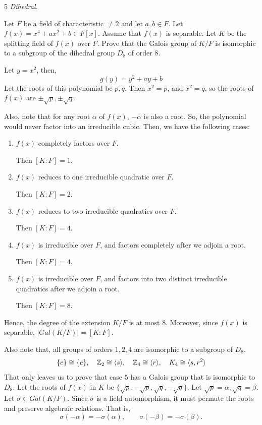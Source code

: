 \documentclass[12pt]{article}
\begin{document}
\newpage 

\begin{problem}{5}
\textit{Dihedral.} 

    Let $F$ be a field of characteristic $\neq 2$ and let $a,b\in F$.
    Let $f(x)=x^4+ax^2+b\in F[x]$. Assume that $f(x)$ is separable.
    Let $K$ be the splitting field of $f(x)$ over $F$.
    Prove that the Galois group of $K/F$ is isomorphic to a subgroup of the dihedral group $D_8$ of order $8$.
\end{problem}

\begin{solution}
    \bbni
    
    Let $y =x^2$, then, 
    \[g(y) = y^2 + ay + b\]
    Let the roots of this polynomial be $p, q$. Then $x^2 = p$, and $x^2 = q$, so the roots of $f(x)$ are $\pm\sqrt{p}, \pm \sqrt{q}$. 
    
    Also, note that for any root $\alpha$ of $f(x)$, $-\alpha$ is also a root. So, the polynomial would never factor into an irreducible cubic. Then, we have the following cases: 
    \begin{enumerate}
        \item $f(x)$ completely factors over $F$.
        
        Then $[K:F] = 1$. 

        \item $f(x)$ reduces to one irreducible quadratic over $F$. 

        Then $[K:F] = 2$. 

        \item $f(x)$ reduces to two irreducible quadratics over $F$.
        
        Then $[K:F] = 4$. 


        \item $f(x)$ is irreducible over $F$, and factors completely after we adjoin a root.
        
        Then $[K:F] = 4$. 

        \item $f(x)$ is irreducible over $F$, and factors into two distinct irreducible  quadratics after we adjoin a root.
        
        Then $[K:F] = 8$. 
    \end{enumerate}
    
    
    Hence, the degree of the extension $K/F$ is at most $8$. Moreover, since $f(x)$ is separable, $|Gal(K/F)| = [K:F]$. 

    Also note that, all groups of orders $1, 2, 4$ are isomorphic to a subgroup of $D_8$.
    \[\{e\} \cong \{e\}, \quad \mathbb Z_2 \cong \langle s \rangle, \quad  \mathbb Z_4 \cong  \langle r \rangle, \quad  K_4 \cong  \langle s, r^2 \rangle\]
    That only leaves us to prove that case $5$ has a Galois group that is isomorphic to $D_8$. Let the roots of $f(x)$ in $K$ be $\{\sqrt{p}, - \sqrt{p},\sqrt{q}, - \sqrt{q} \}$. Let $\sqrt{p} = \alpha, \sqrt{q} = \beta$. 
    Let $\sigma \in {Gal}(K/F)$. Since $\sigma$ is a field automorphism, it must permute the roots and preserve algebraic relations. That is, 
    \[
    \sigma(-\alpha) = -\sigma(\alpha),
    \qquad
    \sigma(-\beta) = -\sigma(\beta).
    \]


\end{solution}
\end{document}
